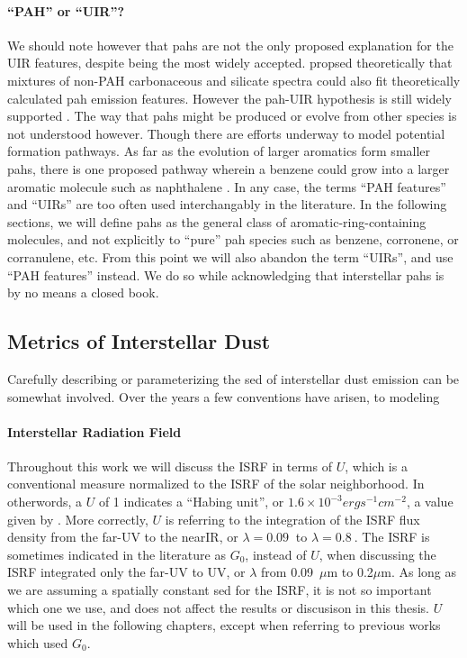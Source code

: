    \paragraph{``PAH'' or ``UIR''?}
      We should note however that \acrshort{pah}s are not the only proposed explanation for the UIR features, despite being the most widely accepted. \cite{zhang14} propsed theoretically that mixtures of non-PAH carbonaceous and silicate spectra could also fit theoretically calculated \acrshort{pah} emission features. However the \acrshort{pah}-UIR hypothesis is still widely supported \citep{tielens08,rastogi13}.  The way that \acrshort{pah}s might be produced or evolve from other species is not understood however. Though there are efforts underway to model potential formation pathways. As far as the evolution of larger aromatics form smaller \acrshort{pah}s, there is one proposed pathway wherein a benzene could grow into a larger aromatic molecule such as naphthalene \citep{ghesquiere14}. In any case, the terms ``PAH features'' and ``UIRs'' are too often used interchangably in the literature. In the following sections, we will define \acrshort{pah}s as the general class of aromatic-ring-containing molecules, and not explicitly to ``pure'' \acrshort{pah} species such as benzene, corronene, or corranulene, etc. From this point we will also abandon the term ``UIRs'', and use ``PAH features'' instead. We do so while acknowledging that interstellar \acrshort{pah}s is by no means a closed book.



     \subsection{Metrics of Interstellar Dust}
      Carefully describing or parameterizing the \acrshort{sed} of interstellar dust emission can be somewhat involved. Over the years a few conventions have arisen, to modeling

      \paragraph{Interstellar Radiation Field}
      Throughout this work we will discuss the ISRF in terms of $U$, which is a conventional measure normalized to the ISRF of the solar neighborhood. In otherwords, a $U$ of 1 indicates a ``Habing unit'', or $1.6\times{}10^{-3} erg s^{-1} cm^{-2}$, a value given by \cite{habing68}. More correctly, $U$ is referring to the integration of the ISRF flux density from the far-UV to the nearIR, or $\lambda =0.09~$ to $\lambda =0.8~$.  The ISRF is sometimes indicated in the literature as $G_0$, instead of $U$, when discussing the ISRF integrated only the far-UV to UV, or $\lambda$ from 0.09~$\mu$m to 0.2$\mu$m. As long as we are assuming a spatially constant \acrshort{sed} for the ISRF, it is not so important which one we use, and does not affect the results or discusison in this thesis. $U$ will be used in the following chapters, except when referring to previous works which used $G_0$.

